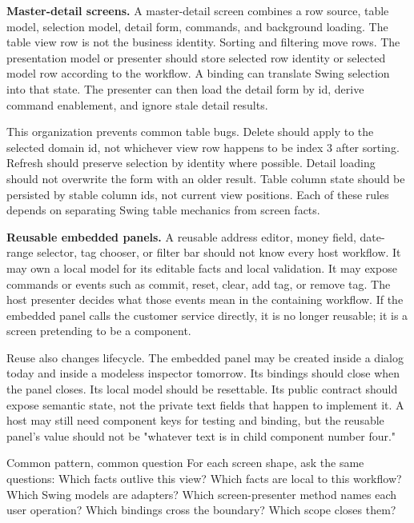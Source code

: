 \textbf{Master-detail screens.} A master-detail screen combines a row source, table model, selection model, detail form, commands, and background loading. The table view row is not the business identity. Sorting and filtering move rows. The presentation model or presenter should store selected row identity or selected model row according to the workflow. A binding can translate Swing selection into that state. The presenter can then load the detail form by id, derive command enablement, and ignore stale detail results.

This organization prevents common table bugs. Delete should apply to the selected domain id, not whichever view row happens to be index 3 after sorting. Refresh should preserve selection by identity where possible. Detail loading should not overwrite the form with an older result. Table column state should be persisted by stable column ids, not current view positions. Each of these rules depends on separating Swing table mechanics from screen facts.

\textbf{Reusable embedded panels.} A reusable address editor, money field, date-range selector, tag chooser, or filter bar should not know every host workflow. It may own a local model for its editable facts and local validation. It may expose commands or events such as commit, reset, clear, add tag, or remove tag. The host presenter decides what those events mean in the containing workflow. If the embedded panel calls the customer service directly, it is no longer reusable; it is a screen pretending to be a component.

Reuse also changes lifecycle. The embedded panel may be created inside a dialog today and inside a modeless inspector tomorrow. Its bindings should close when the panel closes. Its local model should be resettable. Its public contract should expose semantic state, not the private text fields that happen to implement it. A host may still need component keys for testing and binding, but the reusable panel's value should not be "whatever text is in child component number four."

\begin{principlebox}{Common pattern, common question}
For each screen shape, ask the same questions: Which facts outlive this view? Which facts are local to this workflow? Which Swing models are adapters? Which screen-presenter method names each user operation? Which bindings cross the boundary? Which scope closes them?
\end{principlebox}

